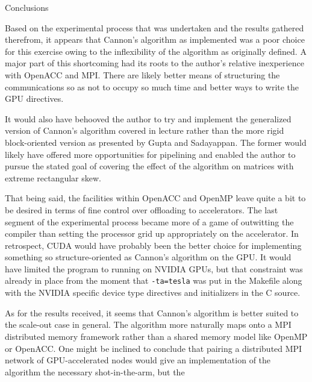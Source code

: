 \documentclass{article}
\begin{document}
  \begin{section}{Conclusions}
    \begin{paragraph}{}
      Based on the experimental process that was undertaken and the results gathered therefrom, it appears that Cannon's algorithm
      as implemented was a poor choice for this exercise owing to the inflexibility of the algorithm as originally defined. A major
      part of this shortcoming had its roots to the author's relative inexperience with OpenACC and MPI. There are likely better
      means of structuring the communications so as not to occupy so much time and better ways to write the GPU directives.
    \end{paragraph}
    \begin{paragraph}{}
      It would also have behooved the author to try and implement the generalized version of Cannon's algorithm covered in lecture
      \autocite[][]{Lecture17Slides} rather than the more rigid block-oriented version as presented by Gupta and Sadayappan\autocite[][]{GuptaSadayappan}.
      The former would likely have offered more opportunities for pipelining and enabled the author to pursue the stated goal of
      covering the effect of the algorithm on matrices with extreme rectangular skew.
    \end{paragraph}
    \begin{paragraph}{}
      That being said, the facilities within OpenACC and OpenMP leave quite a bit to be desired in terms of fine control over offloading
      to accelerators. The last segment of the experimental process became more of a game of outwitting the compiler than setting the processor
      grid up appropriately on the accelerator. In retrospect, CUDA would have probably been the better choice for implementing something so
      structure-oriented as Cannon's algorithm on the GPU. It would have limited the program to running on NVIDIA GPUs, but that constraint
      was already in place from the moment that \texttt{-ta=tesla} was put in the Makefile along with the NVIDIA specific device type directives
      and initializers in the C source.
    \end{paragraph}
    \begin{paragraph}{}
      As for the results received, it seems that Cannon's algorithm is better suited to the scale-out case in general. The algorithm more naturally
      maps onto a MPI distributed memory framework rather than a shared memory model like OpenMP or OpenACC. One might be inclined to conclude that
      pairing a distributed MPI network of GPU-accelerated nodes would give an implementation of the algorithm the necessary shot-in-the-arm, but the

\end{paragraph}
\end{section}
\end{document}
